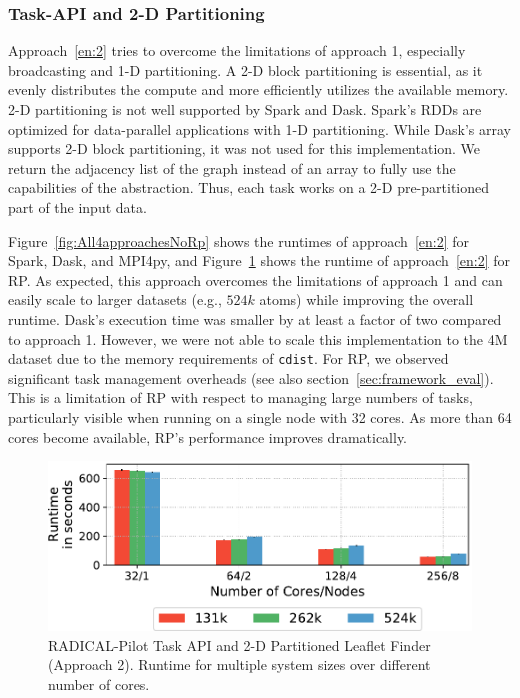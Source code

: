 \subsubsection*{Task-API and 2-D Partitioning}

Approach~\ref{en:2} tries to overcome the limitations of approach 1, especially
broadcasting and 1-D partitioning. A 2-D block partitioning is essential, as it
evenly distributes the compute and more efficiently utilizes the available
memory. 2-D partitioning is not well supported by Spark and Dask. Spark's RDDs
are optimized for data-parallel applications with 1-D partitioning. While Dask's
array supports 2-D block partitioning, it was not used for this implementation.
We return the adjacency list of the graph instead of an array to fully use the
capabilities of the abstraction. Thus, each task works on a 2-D pre-partitioned
part of the input data.

Figure~\ref{fig:All4approachesNoRp} shows the runtimes of approach~\ref{en:2}
for Spark, Dask, and MPI4py, and Figure~\ref{fig:rpLF} shows the runtime of
approach~\ref{en:2} for RP. As expected, this approach overcomes the
limitations of approach 1 and can easily scale to larger datasets (e.g., $524k$
atoms) while improving the overall runtime. Dask's execution time was smaller by
at least a factor of two compared to
approach 1. However, we were not able to scale this implementation to the 4M
dataset due to the memory requirements of \texttt{cdist}. For RP, we
observed significant task management overheads (see also
section~\ref{sec:framework_eval}). This is a limitation of RP with
respect to managing large numbers of tasks, particularly visible when running on
a single node with 32 cores. As more than 64 cores become available, 
RP's performance improves dramatically.

\begin{figure}[t]
    \centering
    \includegraphics[width=.75\textwidth]{figures/data_analytics_hpc/task_par/rpLF.pdf}
    \caption{RADICAL-Pilot Task API and 2-D Partitioned Leaflet Finder (Approach
    2). Runtime for multiple system sizes over different number of cores.}
    \label{fig:rpLF}
\end{figure}

